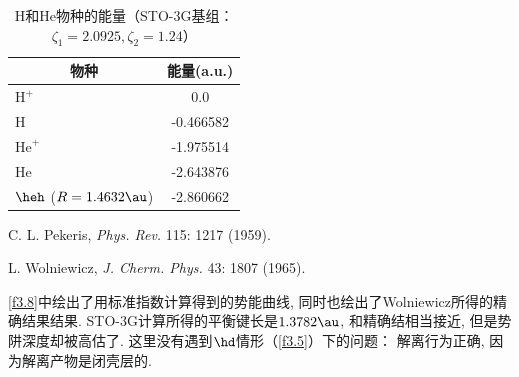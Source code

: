 \begin{table}[h]
\begin{threeparttable}
	\begin{tabular}{lc}
		\hline
		\multicolumn{1}{c}{物种} & 能量(a.u.)  \\ \hline
		$\text{H}^+$             &    0.0    \\
		$\text{H}$               & -0.466582 \\
		$\text{He}^+$            & -1.975514 \\
		$\text{He}$              & -2.643876\tnote{a} \\
		$\heh$ ($R=1.4632\au$) & -2.860662\tnote{b} \\ \hline
	\end{tabular}
	\begin{tablenotes}
		\item[a] C. L. Pekeris, \textit{Phys. Rev.} 115: 1217 (1959).
		\item[b] L. Wolniewicz, \textit{J. Cherm. Phys.} 43: 1807 (1965).
	\end{tablenotes}
\end{threeparttable}
	\centering\caption{$\text{H}$和$\text{He}$物种的能量（STO-3G基组： $\zeta_1=2.0925,\zeta_2=1.24$）}
	\label{t3.6}
\end{table}
\autoref{f3.8}中绘出了用标准指数计算得到的势能曲线,  同时也绘出了Wolniewicz所得的精确结果结果.  STO-3G计算所得的平衡键长是$1.3782\au$, 和精确结相当接近, 但是势阱深度却被高估了. 这里没有遇到$\hd$情形（\autoref{f3.5}）下的问题： 解离行为正确, 因为解离产物是闭壳层的. 
